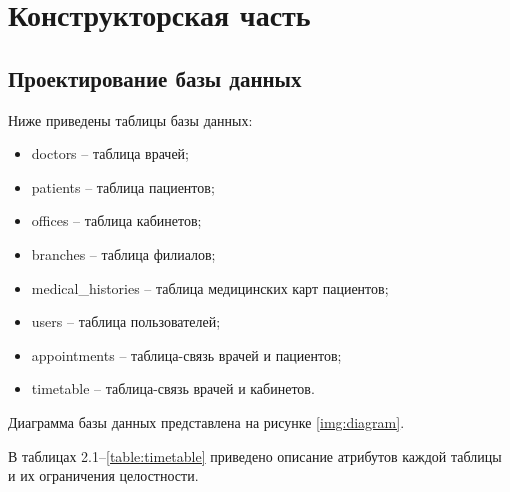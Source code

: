 \chapter{Конструкторская часть}

\section{Проектирование базы данных}

Ниже приведены таблицы базы данных:
\begin{itemize}
	\item doctors -- таблица врачей;
	\item patients -- таблица пациентов;
	\item offices -- таблица кабинетов;
	\item branches -- таблица филиалов;
	\item medical\_histories -- таблица медицинских карт пациентов;
	\item users -- таблица пользователей;
	\item appointments -- таблица-связь врачей и пациентов;
	\item timetable -- таблица-связь врачей и кабинетов.
\end{itemize}

Диаграмма базы данных представлена на рисунке \ref{img:diagram}.


\clearpage
В таблицах 2.1--\ref{table:timetable} приведено описание атрибутов каждой таблицы и их ограничения целостности.

